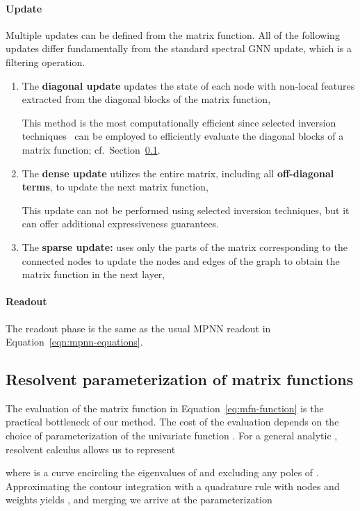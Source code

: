 \documentclass{article} \usepackage{iclr2024_conference,times}
\begin{document}
\paragraph{Update}
Multiple updates can be defined from the matrix function. All of the following updates differ fundamentally from the standard spectral GNN update, which is a filtering operation. 

\begin{enumerate}[leftmargin=1cm]
    \item The \textbf{diagonal update} updates the state of each node with non-local features extracted from the diagonal blocks of the matrix function, 
    
This method is the most computationally efficient since selected inversion techniques~\citep{pexsi_CMS2009} can be employed to efficiently evaluate the diagonal blocks of a matrix function; cf.~Section~\ref{sec:resolvent}. 
    \item The \textbf{dense update} utilizes the entire matrix, including all \textbf{off-diagonal terms}, to update the next matrix function, 

This update can not be performed using selected inversion techniques, but it can offer additional expressiveness guarantees.
    \item The \textbf{sparse update:} uses only the parts of the matrix corresponding to the connected nodes to update the nodes and edges of the graph to obtain the matrix function in the next layer, 
    
\end{enumerate}
\paragraph{Readout}
The readout phase is the same as the usual MPNN readout in Equation~\ref{eqn:mpnn-equations}.

\subsection{Resolvent parameterization of matrix functions}
\label{sec:resolvent}
The evaluation of the matrix function in Equation~\ref{eq:mfn-function} is the practical bottleneck of our method.
The cost of the evaluation depends on the choice of parameterization of the univariate function . 
For a general analytic , resolvent calculus allows us to represent 

where  is a curve encircling the eigenvalues of  and excluding any poles of . Approximating the contour integration with a quadrature rule with nodes  and weights  yields 
, 
and merging  we arrive at the parameterization 
\end{document}
